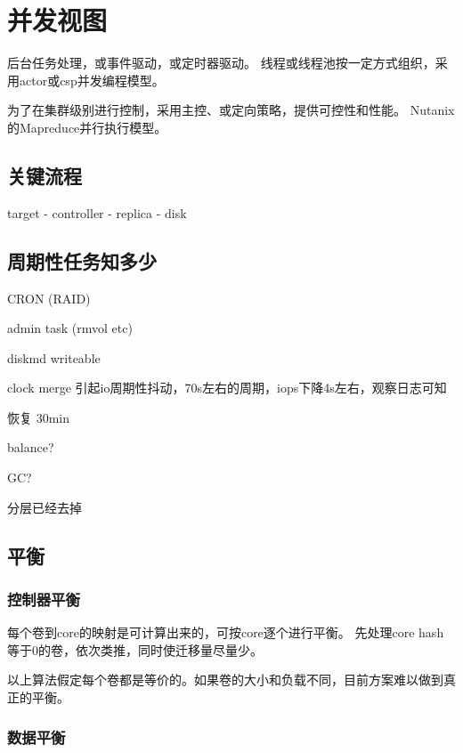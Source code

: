 \chapter{并发视图}

后台任务处理，或事件驱动，或定时器驱动。
线程或线程池按一定方式组织，采用actor或csp并发编程模型。

为了在集群级别进行控制，采用主控、或定向策略，提供可控性和性能。
Nutanix的Mapreduce并行执行模型。

\section{关键流程}

target - controller - replica - disk

\section{周期性任务知多少}

\begin{enumbox}
\item CRON (RAID)
\item admin task (rmvol etc)
\item diskmd writeable
\item clock merge 引起io周期性抖动，70s左右的周期，iops下降4s左右，观察日志可知
\item 恢复 30min
\item balance?
\item GC?
\item 分层已经去掉
\end{enumbox}

\section{平衡}

\subsection{控制器平衡}

每个卷到core的映射是可计算出来的，可按core逐个进行平衡。
先处理core hash等于0的卷，依次类推，同时使迁移量尽量少。

以上算法假定每个卷都是等价的。如果卷的大小和负载不同，目前方案难以做到真正的平衡。

\subsection{数据平衡}

